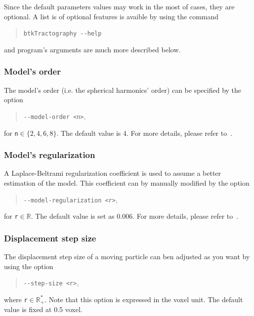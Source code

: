         Since the default parameters values may work in the most of cases, they are optional. A list is of optional features is avaible by using the command
            \begin{quote}
                \texttt{btkTractography -\hspace{0.1mm}-help}
            \end{quote}
        and program's arguments are much more described below.


    \subsubsection*{Model's order}
        The model's order (i.e. the spherical harmonics' order) can be specified by the option
            \begin{quote}
                \texttt{-\hspace{0.1mm}-model-order <n>},
            \end{quote}
        for \texttt{n}$\in\{2,4,6,8\}$. The default value is 4. For more details, please refer to~\cite{descoteaux_regularized_2007}.

    \subsubsection*{Model's regularization}
        A Laplace-Beltrami regularization coefficient is used to assume a better estimation of the model. This coefficient can by manually modified by the option
            \begin{quote}
                \texttt{-\hspace{0.1mm}-model-regularization <r>},
            \end{quote}
        for \texttt{r}$\in\mathbb{R}$. The default value is set as 0.006. For more details, please refer to~\cite{descoteaux_regularized_2007}.

    \subsubsection*{Displacement step size}
        The displacement step size of a moving particle can ben adjusted as you want by using the option
            \begin{quote}
                \texttt{-\hspace{0.1mm}-step-size <r>},
            \end{quote}
        where \texttt{r}$\in\mathbb{R}_+^*$. Note that this option is expressed in the voxel unit. The default value is fixed at 0.5 voxel.

